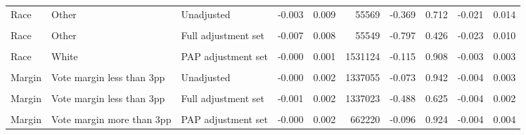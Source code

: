 \begin{table}
\begin{tabular}[t]{lllrrrrrrr}
Race & Other & Unadjusted & -0.003 & 0.009 & 55569 & -0.369 & 0.712 & -0.021 & 0.014\\
\cellcolor{gray!10}{Race} & \cellcolor{gray!10}{Other} & \cellcolor{gray!10}{PAP adjustment set} & \cellcolor{gray!10}{-0.007} & \cellcolor{gray!10}{0.008} & \cellcolor{gray!10}{55566} & \cellcolor{gray!10}{-0.821} & \cellcolor{gray!10}{0.411} & \cellcolor{gray!10}{-0.023} & \cellcolor{gray!10}{0.009}\\
Race & Other & Full adjustment set & -0.007 & 0.008 & 55549 & -0.797 & 0.426 & -0.023 & 0.010\\
\cellcolor{gray!10}{Race} & \cellcolor{gray!10}{White} & \cellcolor{gray!10}{Unadjusted} & \cellcolor{gray!10}{0.000} & \cellcolor{gray!10}{0.002} & \cellcolor{gray!10}{1531127} & \cellcolor{gray!10}{0.085} & \cellcolor{gray!10}{0.932} & \cellcolor{gray!10}{-0.003} & \cellcolor{gray!10}{0.003}\\
Race & White & PAP adjustment set & -0.000 & 0.001 & 1531124 & -0.115 & 0.908 & -0.003 & 0.003\\
\cellcolor{gray!10}{Race} & \cellcolor{gray!10}{White} & \cellcolor{gray!10}{Full adjustment set} & \cellcolor{gray!10}{-0.000} & \cellcolor{gray!10}{0.001} & \cellcolor{gray!10}{1531107} & \cellcolor{gray!10}{-0.069} & \cellcolor{gray!10}{0.945} & \cellcolor{gray!10}{-0.003} & \cellcolor{gray!10}{0.003}\\
Margin & Vote margin less than 3pp & Unadjusted & -0.000 & 0.002 & 1337055 & -0.073 & 0.942 & -0.004 & 0.003\\
\cellcolor{gray!10}{Margin} & \cellcolor{gray!10}{Vote margin less than 3pp} & \cellcolor{gray!10}{PAP adjustment set} & \cellcolor{gray!10}{-0.001} & \cellcolor{gray!10}{0.002} & \cellcolor{gray!10}{1337052} & \cellcolor{gray!10}{-0.543} & \cellcolor{gray!10}{0.587} & \cellcolor{gray!10}{-0.004} & \cellcolor{gray!10}{0.002}\\
Margin & Vote margin less than 3pp & Full adjustment set & -0.001 & 0.002 & 1337023 & -0.488 & 0.625 & -0.004 & 0.002\\
\cellcolor{gray!10}{Margin} & \cellcolor{gray!10}{Vote margin more than 3pp} & \cellcolor{gray!10}{Unadjusted} & \cellcolor{gray!10}{-0.001} & \cellcolor{gray!10}{0.002} & \cellcolor{gray!10}{662223} & \cellcolor{gray!10}{-0.310} & \cellcolor{gray!10}{0.757} & \cellcolor{gray!10}{-0.005} & \cellcolor{gray!10}{0.004}\\
Margin & Vote margin more than 3pp & PAP adjustment set & -0.000 & 0.002 & 662220 & -0.096 & 0.924 & -0.004 & 0.004\\

\end{tabular}
\end{table}
